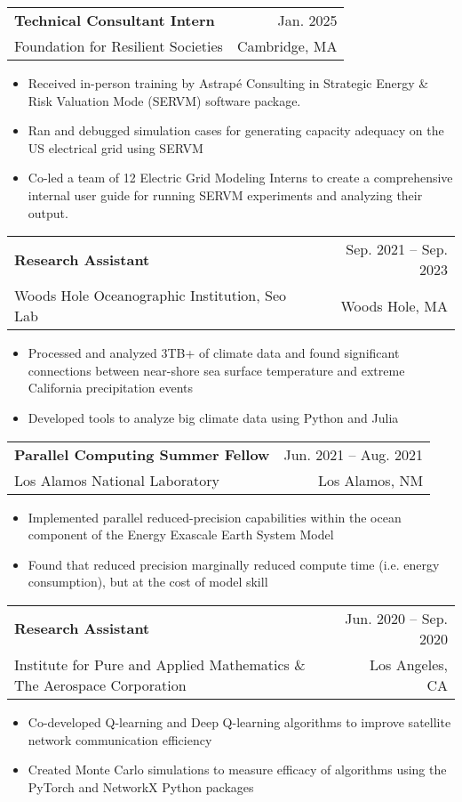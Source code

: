 \documentclass[letterpaper,11pt]{article}
\makeatletter
\newcommand{\resumeItem}[1]{
  \item\small{
    {#1 \vspace{-2pt}}
  }
}
\newcommand{\resumeSubheading}[4]{
  \vspace{-2pt}\item
    \begin{tabular*}{0.97\textwidth}[t]{@{\extracolsep{\fill}}p{0.6\textwidth}r}
      \textbf{\parbox[t]{0.6\textwidth}{#1}} & #2 \\
      \small \parbox[t]{0.6\textwidth}{#3} & {\small #4} \\
    \end{tabular*}\vspace{-7pt}
}
\newcommand{\resumeSubSubheading}[2]{
    \item
    \begin{tabular*}{0.97\textwidth}{l@{\extracolsep{\fill}}r}
      \textit{\small#1} & \textit{\small #2} \\
    \end{tabular*}\vspace{-7pt}
}
\newcommand{\resumeSubHeadingListEnd}{\end{itemize}}
\newcommand{\resumeItemListStart}{\begin{itemize}}
\newcommand{\resumeItemListEnd}{\end{itemize}\vspace{-5pt}}
\makeatother
\begin{document}
    \resumeSubheading
      {Technical Consultant Intern}{Jan. 2025}
      {Foundation for Resilient Societies}{Cambridge, MA}
      \resumeItemListStart
        \resumeItem{Received in-person training by Astrapé Consulting in Strategic Energy \& Risk Valuation Mode (SERVM) software package.}
        \resumeItem{Ran and debugged simulation cases for generating capacity adequacy on the US electrical grid using SERVM}
        \resumeItem{Co-led a team of 12 Electric Grid Modeling Interns to create a comprehensive internal user guide for running SERVM experiments and analyzing their output.}
      \resumeItemListEnd
      
    \resumeSubheading
      {Research Assistant}{Sep. 2021 -- Sep. 2023}
      {Woods Hole Oceanographic Institution, Seo Lab}{Woods Hole, MA}
      \resumeItemListStart
        \resumeItem{Processed and analyzed 3TB+ of climate data and found significant connections between near-shore sea surface temperature and 
        extreme California precipitation events}
        \resumeItem{Developed tools to analyze big climate data using Python and Julia}
      \resumeItemListEnd

    \resumeSubheading
      {Parallel Computing Summer Fellow}{Jun. 2021 -- Aug. 2021}
      {Los Alamos National Laboratory}{Los Alamos, NM}
      \resumeItemListStart
        \resumeItem{Implemented parallel reduced-precision capabilities within the ocean component of the Energy Exascale Earth System Model}
        \resumeItem{Found that reduced precision marginally reduced compute time (i.e. energy consumption), but at the cost of model skill}
    \resumeItemListEnd

    \resumeSubheading
      {Research Assistant}{Jun. 2020 -- Sep. 2020}
      {Institute for Pure and Applied Mathematics \& The Aerospace Corporation}{Los Angeles, CA}
      \resumeItemListStart
        \resumeItem{Co-developed Q-learning and Deep Q-learning algorithms to improve satellite network communication efficiency }
        \resumeItem{Created Monte Carlo simulations to measure efficacy of algorithms using the PyTorch and NetworkX  Python packages}
      \resumeItemListEnd
\end{document}
